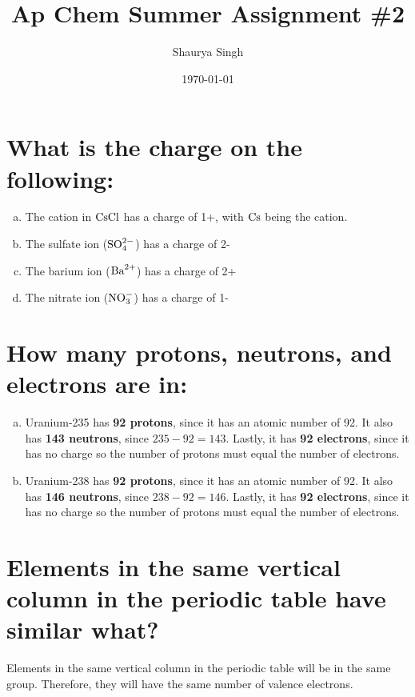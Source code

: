 \documentclass[11pt]{article}
\author{Shaurya Singh}
\date{\today}
\title{Ap Chem Summer Assignment \#2}
\begin{document}
\maketitle

\section{What is the charge on the following:}
\label{sec:orgdf9cd7e}
\begin{enumerate}[(a)]
\item The cation in \(\ce{CsCl}\) has a charge of 1+, with \(\ce{Cs}\) being the cation.
\item The sulfate ion (\(\ce{SO^{2-}4}\)) has a charge of 2-
\item The barium ion (\(\ce{Ba^{2+}}\)) has a charge of 2+
\item The nitrate ion (\(\ce{NO^-3}\)) has a charge of 1-
\end{enumerate}

\section{How many protons, neutrons, and electrons are in:}
\label{sec:orga2389ab}
\begin{enumerate}[(a)]
\item Uranium-235 has \textbf{92 protons}, since it has an atomic number of 92. It also has \textbf{143 neutrons}, since \(235-92=143\). Lastly, it has \textbf{92 electrons}, since it has no charge so the number of protons must equal the number of electrons.
\item Uranium-238 has \textbf{92 protons}, since it has an atomic number of 92. It also has \textbf{146 neutrons}, since \(238-92=146\). Lastly, it has \textbf{92 electrons}, since it has no charge so the number of protons must equal the number of electrons.
\end{enumerate}

\section{Elements in the same vertical column in the periodic table have similar what?}
\label{sec:org140dd63}
Elements in the same vertical column in the periodic table will be in the same group. Therefore, they will have the same number of valence electrons.
\end{document}
